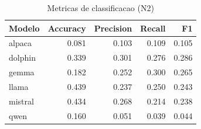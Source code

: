 \begin{table}[ht]
  \centering
  \caption{Metricas de classificacao (N2)}
  \label{tab:results_n2_classification}
  \begin{tabular}{lrrrr}
    \toprule
    Modelo & Accuracy & Precision & Recall & F1 \\
    \midrule
    alpaca & 0.081 & 0.103 & 0.109 & 0.105 \\
    dolphin & 0.339 & 0.301 & 0.276 & 0.286 \\
    gemma & 0.182 & 0.252 & 0.300 & 0.265 \\
    llama & 0.439 & 0.237 & 0.250 & 0.243 \\
    mistral & 0.434 & 0.268 & 0.214 & 0.238 \\
    qwen & 0.160 & 0.051 & 0.039 & 0.044 \\
    \bottomrule
  \end{tabular}
\end{table}
